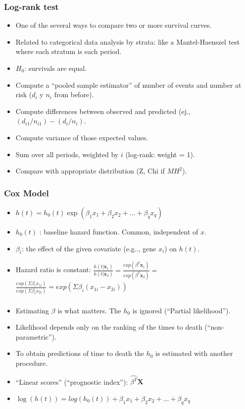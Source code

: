 \begin{frame}
\frametitle{Log-rank test}
\begin{itemize}
\item One of the several ways to compare two or more survival curves.
\item Related to categorical data analysis by strata: like a
  Mantel-Haenszel test where each stratum is each period.
\item $H_0$: survivals are equal.
\item Compute a ``pooled sample estimator'' of number of events and number
  at risk  ($d_i$ y $n_i$ from before).
\item Compute differences between observed and predicted (ej.,
  $(d_{i1}/n_{i1}) - (d_{i}/n_{i})$.
\item Compute variance of those expected values.
\item Sum over all periods, weighted by $i$ (log-rank: weight
  = 1).
\item Compare with appropriate distribution (Z, Chi if $MH^2$).
\end{itemize}
\end{frame}


\begin{frame}
\frametitle{Cox Model}
\begin{itemize}
\item $h(t) = h_0(t) \exp(\beta_1 x_1 + \beta_2 x_2 + \ldots + \beta_q x_q)$
\item $h_0(t)$ : baseline hazard function. Common, independent of 
  $x$.
\item $\beta_i$: the effect of the given covariate (e.g.., gene $x_i$) on 
  $h(t)$.
\item Hazard ratio is constant:
  $\frac{h(t|\mathbf{x}_1)}{h(t|\mathbf{x}_2)} =
  \frac{exp(\beta^T\mathbf{x}_1)}{exp(\beta^T\mathbf{x}_2)} = $
$ \frac{exp(\Sigma \beta_i x_{1i})}{exp(\Sigma \beta_i x_{2i})} = 
  exp(\Sigma \beta_i (x_{1i} - x_{2i}))$
\end{itemize}
\end{frame}


\begin{frame}
\frametitle{}
\begin{itemize}
\item Estimating $\beta$ is what matters. The $h_0$ is ignored (``Partial likelihood'').
\item Likelihood depends only on the ranking of the times to death (``non-parametric'').
\item To obtain predictions of time to death the  $h_0$ is estimated with
  another procedure.
\item ``Linear scores'' (``prognostic index''): $\hat{\beta^T}\mathbf{X}$
\item $\log(h(t)) = log(h_0(t)) + \beta_1 x_1 + \beta_2 x_2 + \ldots + \beta_q x_q$

\end{itemize}
\end{frame}




